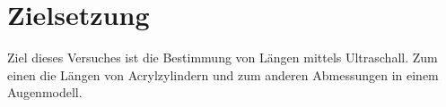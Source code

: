 \section{Zielsetzung}
\label{sec:Ziel}
Ziel dieses Versuches ist die Bestimmung von Längen mittels Ultraschall.
Zum einen die Längen von Acrylzylindern und zum anderen Abmessungen in einem Augenmodell.
